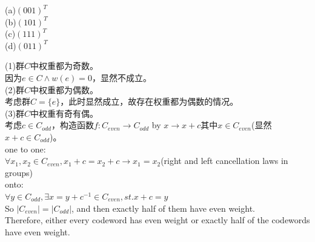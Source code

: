 \documentclass[a4paper, justified]{tufte-handout}
\begin{document}
\begin{solution}
(a)$(001)^T$\\
(b)$(101)^T$\\
(c)$(111)^T$\\
(d)$(011)^T$\\
\end{solution}

\begin{problem}[TJ 8-19]
\end{problem}

\begin{solution}
(1)群$C$中权重都为奇数。\\
因为$e\in C\land w(e)=0$，显然不成立。\\
(2)群$C$中权重都为偶数。\\
考虑群$C=\{e\}$，此时显然成立，故存在权重都为偶数的情况。\\
(3)群$C$中权重有奇有偶。\\
考虑$c\in C_{odd}$，构造函数$f:C_{even}\to C_{odd}$ by $x\to x+c$其中$x\in C_{even}$(显然$x+c\in C_{odd}$)。\\
one to one:\\
$\forall x_1, x_2\in C_{even}, x_1+ c = x_2 + c \to x_1 = x_2$(right and left cancellation laws in groups)\\
onto:\\
$\forall y\in C_{odd}, \exists x = y + c^{-1}\in C_{even}, st.x + c = y$\\
So $|C_{even}|=|C_{odd}|$, and then exactly half of them have even weight.\\

\noindent Therefore, either every codeword has even weight or exactly half of the codewords have even weight.
\end{solution}

\begin{problem}[TJ 8-21]
\end{problem}
\end{document}
